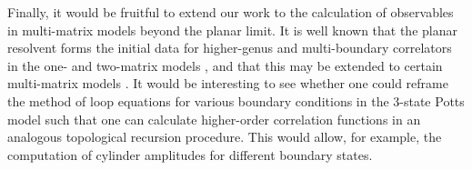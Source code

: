 Finally, it would be fruitful to extend our work to the calculation of observables in multi-matrix
models beyond the planar limit. It is well known that the planar resolvent forms the initial data
for higher-genus and multi-boundary correlators in the one- and two-matrix models
\cite{Eynard:2002kg,Eynard:2004mh,Eynard:2008we}, and that this may be extended to certain
multi-matrix models \cite{Borot:2009ia}. It would be interesting to see whether one could reframe
the method of loop equations for various boundary conditions in the 3-state Potts model such that
one can calculate higher-order correlation functions in an analogous topological recursion
procedure. This would allow, for example, the computation of cylinder amplitudes for different
boundary states.
